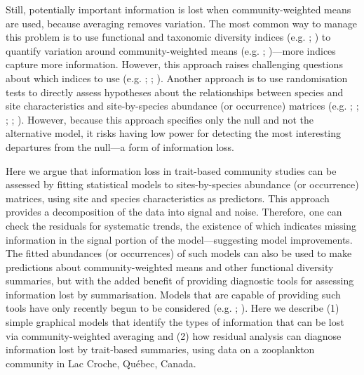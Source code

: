 \documentclass[12pt]{ecology}
\begin{document}
Still, potentially important information is lost when community-weighted means are used, because averaging removes variation.  The most common way to manage this problem is to use functional and taxonomic diversity indices (e.g. ; ) to quantify variation around community-weighted means (e.g. ; )---more indices capture more information.  However, this approach raises challenging questions about which indices to use (e.g. ; ; ).  Another approach is to use randomisation tests to directly assess hypotheses about the relationships between species and site characteristics and site-by-species abundance (or occurrence) matrices (e.g. ; ; ; ; ).  However, because this approach specifies only the null and not the alternative model, it risks having low power for detecting the most interesting departures from the null---a form of information loss.

Here we argue that information loss in trait-based community studies can be assessed by fitting statistical models to sites-by-species abundance (or occurrence) matrices, using site and species characteristics as predictors.  This approach provides a decomposition of the data into signal and noise.  Therefore, one can check the residuals for systematic trends, the existence of which indicates missing information in the signal portion of the model---suggesting model improvements.  The fitted abundances (or occurrences) of such models can also be used to make predictions about community-weighted means and other functional diversity summaries, but with the added benefit of providing diagnostic tools for assessing information lost by summarisation.  Models that are capable of providing such tools have only recently begun to be considered (e.g. ; ).  Here we describe (1) simple graphical models that identify the types of information that can be lost via community-weighted averaging and (2) how residual analysis can diagnose information lost by trait-based summaries, using data on a zooplankton community in Lac Croche, Qu\'{e}bec, Canada.
\end{document}
